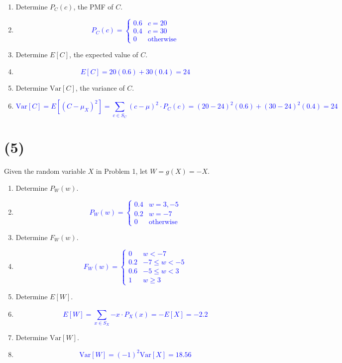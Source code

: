 \documentclass[12pt]{article}
\begin{document}
\begin{enumerate}
    \item[(a)] Determine $P_C(c)$, the PMF of $C$.
    \item[] \textcolor{blue}{\[
P_C(c) =
\begin{cases}
0.6 & c = 20 \\
0.4 & c = 30 \\
0 & \text{otherwise}
\end{cases}
\]}
    \item[(b)] Determine $E[C]$, the expected value of $C$.
    \item[] \textcolor{blue}{\[E[C] = 20(0.6) + 30(0.4) = 24\]}
    \item[(c)] Determine $\mathrm{Var}[C]$, the variance of $C$.
    \item[] \textcolor{blue}{\[\mathrm{Var}[C] = E[(C-\mu_X)^2] = \sum_{c\in S_C}^{}{(c-\mu)^2\cdot P_C(c)} = (20-24)^2(0.6) + (30-24)^2(0.4) = 24\]}
    
\end{enumerate}
\newpage

\section*{(5)}
Given the random variable $X$ in Problem 1, let $W = g(X) = -X$.

\begin{enumerate}
    \item[(a)] Determine $P_W(w)$.
    \item[] \textcolor{blue}{\[
P_W(w) =
\begin{cases}
0.4 & w=3,-5 \\
0.2 & w = -7\\
0 & \text{otherwise}
\end{cases}
\]}
    \item[(b)] Determine $F_W(w)$.
    \item[] \textcolor{blue}{ \[
F_W(w) =
\begin{cases}
0 & w < -7 \\
0.2 & -7 \leq w < -5 \\
0.6 & -5 \leq w < 3 \\
1 &  w \geq 3
\end{cases}
\]}
    \item[(c)] Determine $E[W]$.
    \item[] \textcolor{blue}{\[E[W]=\sum_{x\in S_X}^{}{-x\cdot P_X(x)} =-E[X]= -2.2\]}
    \item[(d)] Determine $\mathrm{Var}[W]$.
    \item[] \textcolor{blue}{\[\mathrm{Var}[W] = (-1)^2\mathrm{Var}[X] = 18.56\]}
\end{enumerate}
\newpage 
\end{document}
